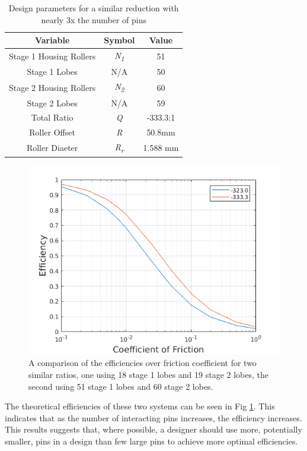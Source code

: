 \begin{table}[h]
  \vskip0.2cm
  \caption{Design parameters for a similar reduction with nearly 3x the number of pins}
  \label{table:two_stage_high_pins}
  \begin{center}
    \vskip-0.2cm
	\begin{tabular}{|c|c|c|}
		\hline
		Variable & Symbol & Value\\
		\hline
		Stage 1 Housing Rollers & \textit{N\textsubscript{1}} & 51\\
		\hline
		Stage 1 Lobes & N/A & 50\\
		\hline
		Stage 2 Housing Rollers & \textit{N\textsubscript{2}} & 60\\
		\hline
		Stage 2 Lobes & N/A & 59\\
		\hline
		Total Ratio & \textit{Q} & -333.3:1 \\
		\hline
		Roller Offset & \textit{R} & 50.8mm \\
		\hline
		Roller Diaeter & \textit{R\textsubscript{r}} & 1.588 mm\\
		\hline
	\end{tabular}
  \end{center}
\end{table}

\begin{figure}[h]
	\centering
	\includegraphics[width=0.75\linewidth]{fig/two_stage_more_pins}
   \caption{A comparison of the efficiencies over friction coefficient for two similar ratios, one using 18 stage 1 lobes and 19 stage 2 lobes, the second using 51 stage 1 lobes and 60 stage 2 lobes.}
   \label{fig:two_stage_more_pins}
\end{figure}

The theoretical efficiencies of these two systems can be seen in Fig \ref{fig:two_stage_more_pins}. This indicates that as the number of interacting pins increases, the efficiency increases. This results suggests that, where possible, a designer should use more, potentially smaller, pins in a design than few large pins to achieve more optimal efficiencies. 


